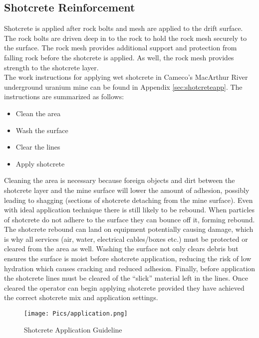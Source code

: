 \subsection{Shotcrete Reinforcement}

Shotcrete is applied after rock bolts and mesh are applied to the drift surface. The rock bolts are driven deep in to the rock to hold the rock mesh securely to the surface. The rock mesh provides additional support and protection from falling rock before the shotcrete is applied. As well, the rock mesh provides strength to the shotcrete layer.\\

The work instructions for applying wet shotcrete in Cameco's MacArthur River underground uranium mine can be found in Appendix \ref{sec:shotcreteapp}. The instructions are summarized as follows:
\begin{itemize}
\item Clean the area
\item Wash the surface
\item Clear the lines
\item Apply shotcrete
\end{itemize}

Cleaning the area is necessary because foreign objects and dirt between the shotcrete layer and the mine surface will lower the amount of adhesion, possibly leading to shagging (sections of shotcrete detaching from the mine surface). Even with ideal application technique there is still likely to be rebound. When particles of shotcrete do not adhere to the surface they can bounce off it, forming rebound. The shotcrete rebound can land on equipment potentially causing damage, which is why all services (air, water, electrical cables/boxes etc.) must be protected or cleared from the area as well. Washing the surface not only clears debris but ensures the surface is moist before shotcrete application, reducing the risk of low hydration which causes cracking and reduced adhesion. Finally, before application the shotcrete lines must be cleared of the ``slick'' material left in the lines. Once cleared the operator can begin applying shotcrete provided they have achieved the correct shotcrete mix and application settings.\\

\begin{figure}[h!]
    \centering
    \texttt{[image: Pics/application.png]}
    \caption{Shotcrete Application Guideline \cite{camedoc}}
    \label{fig:instshot}
\end{figure}

